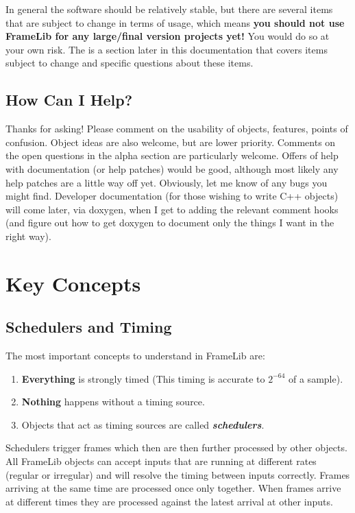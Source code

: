 \documentclass{article}
\begin{document}
In general the software should be relatively stable, but there are several items that are subject to change in terms of usage, which means \textbf{you should not use FrameLib for any large/final version projects yet!} You would do so at your own risk. The is a section later in this documentation that covers items subject to change and specific questions about these items.

\subsection{How Can I Help?}

Thanks for asking! Please comment on the usability of objects, features, points of confusion. Object ideas are also welcome, but are lower priority. Comments on the open questions in the alpha section are particularly welcome. Offers of help with documentation (or help patches) would be good, although most likely any help patches are a little way off yet. Obviously, let me know of any bugs you might find. Developer documentation (for those wishing to write C++ objects) will come later, via doxygen, when I get to adding the relevant comment hooks (and figure out how to get doxygen to document only the things I want in the right way).
\pagebreak


\section{Key Concepts}
\vspace{0.1in}

\subsection{Schedulers and Timing}

The most important concepts to understand in FrameLib are:

 \begin{enumerate}
\item{\textbf{Everything} is strongly timed (This timing is accurate to $2^{-64}$ of a sample).}
\item{\textbf{Nothing} happens without a timing source.}
\item{Objects that act as timing sources are called \textbf{\textit{schedulers}}.}
 \end{enumerate}

Schedulers trigger frames which then are then further processed by other objects. All FrameLib objects can accept inputs that are running at different rates (regular or irregular) and will resolve the timing between inputs correctly. Frames arriving at the same time are processed once only together. When frames arrive at different times they are processed against the latest arrival at other inputs.
\end{document}
